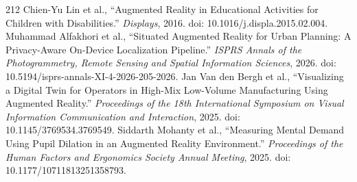\begin{thebibliography}{212}
 Chien-Yu Lin et al., ``Augmented Reality in Educational Activities for Children with Disabilities.'' \emph{Displays}, 2016. doi: 10.1016/j.displa.2015.02.004.
 Muhammad Alfakhori et al., ``Situated Augmented Reality for Urban Planning: A Privacy-Aware On-Device Localization Pipeline.'' \emph{ISPRS Annals of the Photogrammetry, Remote Sensing and Spatial Information Sciences}, 2026. doi: 10.5194/isprs-annals-XI-4-2026-205-2026.
 Jan Van den Bergh et al., ``Visualizing a Digital Twin for Operators in High-Mix Low-Volume Manufacturing Using Augmented Reality.'' \emph{Proceedings of the 18th International Symposium on Visual Information Communication and Interaction}, 2025. doi: 10.1145/3769534.3769549.
 Siddarth Mohanty et al., ``Measuring Mental Demand Using Pupil Dilation in an Augmented Reality Environment.'' \emph{Proceedings of the Human Factors and Ergonomics Society Annual Meeting}, 2025. doi: 10.1177/10711813251358793.
\end{thebibliography}

